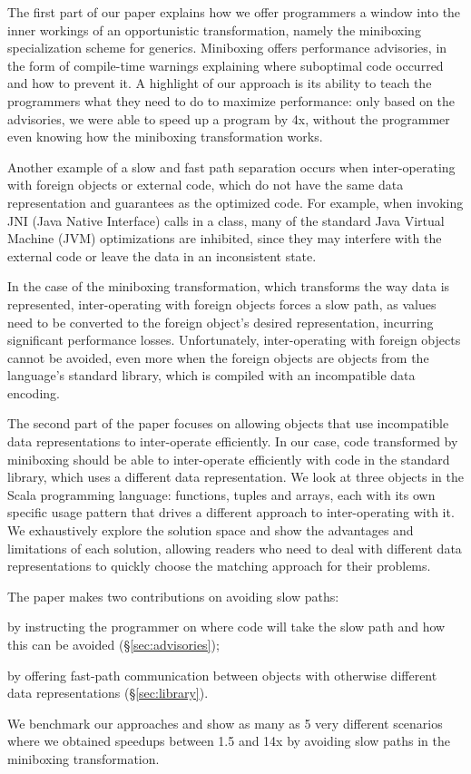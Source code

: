 The first part of our paper explains how we offer programmers a window into the inner workings of an opportunistic transformation, namely the miniboxing specialization scheme for generics. Miniboxing offers performance advisories, in the form of compile-time warnings explaining where suboptimal code occurred and how to prevent it. A highlight of our approach is its ability to teach the programmers what they need to do to maximize performance: only based on the advisories, we were able to speed up a program by 4x, without the programmer even knowing how the miniboxing transformation works.

Another example of a slow and fast path separation occurs when inter-operating with foreign objects or external code, which do not have the same data representation and guarantees as the optimized code. For example, when invoking JNI (Java Native Interface) calls in a class, many of the standard Java Virtual Machine (JVM) optimizations are inhibited, since they may interfere with the external code or leave the data in an inconsistent state.

In the case of the miniboxing transformation, which transforms the way data is represented, inter-operating with foreign objects forces a slow path, as values need to be converted to the foreign object's desired representation, incurring significant performance losses. Unfortunately, inter-operating with foreign objects cannot be avoided, even more when the foreign objects are objects from the language's standard library, which is compiled with an incompatible data encoding.

The second part of the paper focuses on allowing objects that use incompatible data representations to inter-operate efficiently. In our case, code transformed by miniboxing should be able to inter-operate efficiently with code in the standard library, which uses a different data representation. We look at three objects in the Scala programming language: functions, tuples and arrays, each with its own specific usage pattern that drives a different approach to inter-operating with it. We exhaustively explore the solution space and show the advantages and limitations of each solution, allowing readers who need to deal with different data representations to quickly choose the matching approach for their problems.

The paper makes two contributions on avoiding slow paths:
\begin{compactitem}
  \item by instructing the programmer on where code will take the slow path and how this can be avoided (\S\ref{sec:advisories});
  \item by offering fast-path communication between objects with otherwise different data representations (\S\ref{sec:library}).
\end{compactitem}

We benchmark our approaches and show as many as 5 very different scenarios where we obtained speedups between 1.5 and 14x by avoiding slow paths in the miniboxing transformation.
